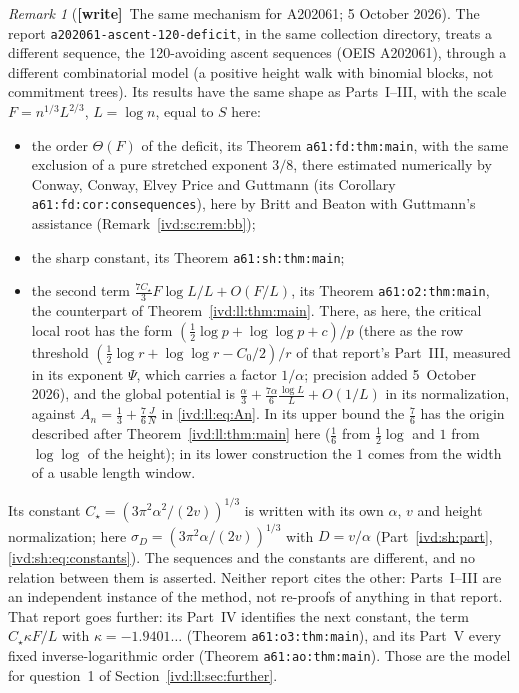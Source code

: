 \documentclass[11pt,letterpaper]{article}
\theoremstyle{remark}\newtheorem{remark}[theorem]{Remark}
\numberwithin{equation}{section}
\newcommand{\file}[1]{\nolinkurl{#1}}
\newcommand{\wtag}{\textup{\textbf{[write]}}}
\begin{document}
\begin{remark}[\wtag\ The same mechanism for A202061; 5 October 2026]\label{ivd:ll:rem:a202061}
The report \file{a202061-ascent-120-deficit}, in the same collection directory, treats a different sequence, the 120-avoiding ascent sequences (OEIS A202061), through a different combinatorial model (a positive height walk with binomial blocks, not commitment trees). Its results have the same shape as Parts~I--III, with the scale $F=n^{1/3}L^{2/3}$, $L=\log n$, equal to $S$ here:
\begin{itemize}
\item the order $\Theta(F)$ of the deficit, its Theorem \texttt{a61:fd:thm:main}, with the same exclusion of a pure stretched exponent $3/8$, there estimated numerically by Conway, Conway, Elvey Price and Guttmann (its Corollary \texttt{a61:fd:cor:consequences}), here by Britt and Beaton with Guttmann's assistance (Remark~\ref{ivd:sc:rem:bb});
\item the sharp constant, its Theorem \texttt{a61:sh:thm:main};
\item the second term $\frac{7C_\star}3F\log L/L+O(F/L)$, its Theorem \texttt{a61:o2:thm:main}, the counterpart of Theorem~\ref{ivd:ll:thm:main}. There, as here, the critical local root has the form $(\frac12\log p+\log\log p+c)/p$ (there as the row threshold $(\frac12\log r+\log\log r-C_0/2)/r$ of that report's Part~III, measured in its exponent $\Psi$, which carries a factor $1/\alpha$; precision added 5~October 2026), and the global potential is $\frac\alpha3+\frac{7\alpha}6\frac{\log L}L+O(1/L)$ in its normalization, against $A_n=\frac13+\frac76\frac JN$ in \eqref{ivd:ll:eq:An}. In its upper bound the $\frac76$ has the origin described after Theorem~\ref{ivd:ll:thm:main} here ($\frac16$ from $\frac12\log$ and $1$ from $\log\log$ of the height); in its lower construction the $1$ comes from the width of a usable length window.
\end{itemize}
Its constant $C_\star=(3\pi^2\alpha^2/(2v))^{1/3}$ is written with its own $\alpha$, $v$ and height normalization; here $\sigma_D=(3\pi^2\alpha/(2v))^{1/3}$ with $D=v/\alpha$ (Part~\ref{ivd:sh:part}, \eqref{ivd:sh:eq:constants}). The sequences and the constants are different, and no relation between them is asserted. Neither report cites the other: Parts~I--III are an independent instance of the method, not re-proofs of anything in that report. That report goes further: its Part~IV identifies the next constant, the term $C_\star\kappa F/L$ with $\kappa=-1.9401\ldots$ (Theorem \texttt{a61:o3:thm:main}), and its Part~V every fixed inverse-logarithmic order (Theorem \texttt{a61:ao:thm:main}). Those are the model for question~1 of Section~\ref{ivd:ll:sec:further}.
\end{remark}
\end{document}
